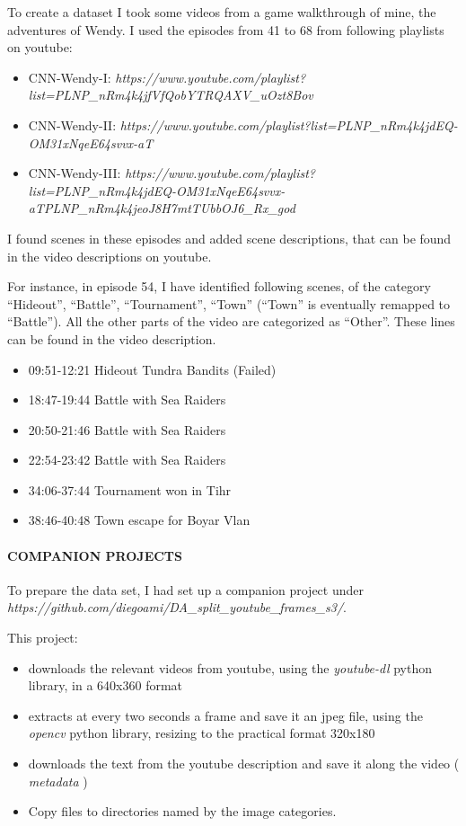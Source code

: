 \documentclass[
]{article}
\providecommand{\tightlist}{%
  \setlength{\itemsep}{0pt}\setlength{\parskip}{0pt}}
\begin{document}
To create a dataset I took some videos from a game walkthrough of mine,
the adventures of Wendy. I used the episodes from 41 to 68 from
following playlists on youtube:

\begin{itemize}
\tightlist
\item
  CNN-Wendy-I:
  \emph{https://www.youtube.com/playlist?list=PLNP\_nRm4k4jfVfQobYTRQAXV\_uOzt8Bov}
\item
  CNN-Wendy-II:
  \emph{https://www.youtube.com/playlist?list=PLNP\_nRm4k4jdEQ-OM31xNqeE64svvx-aT}
\item
  CNN-Wendy-III:
  \emph{https://www.youtube.com/playlist?list=PLNP\_nRm4k4jdEQ-OM31xNqeE64svvx-aTPLNP\_nRm4k4jeoJ8H7mtTUbbOJ6\_Rx\_god}
\end{itemize}

I found scenes in these episodes and added scene descriptions, that can
be found in the video descriptions on youtube.

For instance, in episode 54, I have identified following scenes, of the
category ``Hideout'', ``Battle'', ``Tournament'', ``Town'' (``Town'' is
eventually remapped to ``Battle''). All the other parts of the video are
categorized as ``Other''. These lines can be found in the video
description.

\begin{itemize}
\tightlist
\item
  09:51-12:21 Hideout Tundra Bandits (Failed)
\item
  18:47-19:44 Battle with Sea Raiders
\item
  20:50-21:46 Battle with Sea Raiders
\item
  22:54-23:42 Battle with Sea Raiders
\item
  34:06-37:44 Tournament won in Tihr
\item
  38:46-40:48 Town escape for Boyar Vlan
\end{itemize}

\hypertarget{companion-projects}{%
\paragraph{COMPANION PROJECTS}\label{companion-projects}}

To prepare the data set, I had set up a companion project under
\emph{https://github.com/diegoami/DA\_split\_youtube\_frames\_s3/}.

This project:

\begin{itemize}
\tightlist
\item
  downloads the relevant videos from youtube, using the
  \emph{youtube-dl} python library, in a 640x360 format
\item
  extracts at every two seconds a frame and save it an jpeg file, using
  the \emph{opencv} python library, resizing to the practical format
  320x180
\item
  downloads the text from the youtube description and save it along the
  video ( \emph{metadata} )
\item
  Copy files to directories named by the image categories.
\end{itemize}
\end{document}
